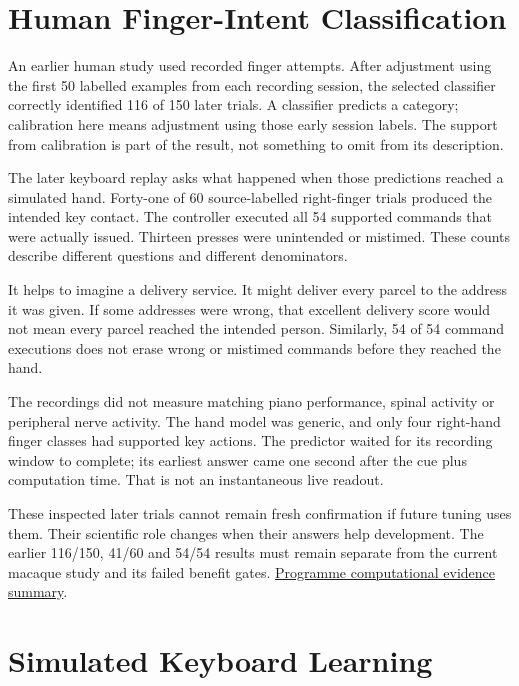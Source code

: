 \section{Human Finger-Intent Classification}

An earlier human study used recorded finger attempts. After adjustment using the first 50 labelled examples from each recording session, the selected classifier correctly identified 116 of 150 later trials. A classifier predicts a category; calibration here means adjustment using those early session labels. The support from calibration is part of the result, not something to omit from its description.\par

The later keyboard replay asks what happened when those predictions reached a simulated hand. Forty-one of 60 source-labelled right-finger trials produced the intended key contact. The controller executed all 54 supported commands that were actually issued. Thirteen presses were unintended or mistimed. These counts describe different questions and different denominators.\par

It helps to imagine a delivery service. It might deliver every parcel to the address it was given. If some addresses were wrong, that excellent delivery score would not mean every parcel reached the intended person. Similarly, 54 of 54 command executions does not erase wrong or mistimed commands before they reached the hand.\par

The recordings did not measure matching piano performance, spinal activity or peripheral nerve activity. The hand model was generic, and only four right-hand finger classes had supported key actions. The predictor waited for its recording window to complete; its earliest answer came one second after the cue plus computation time. That is not an instantaneous live readout.\par

These inspected later trials cannot remain fresh confirmation if future tuning uses them. Their scientific role changes when their answers help development. The earlier 116/150, 41/60 and 54/54 results must remain separate from the current macaque study and its failed benefit gates. \href{research-evidence.json}{Programme computational evidence summary}.\par

\section{Simulated Keyboard Learning}

